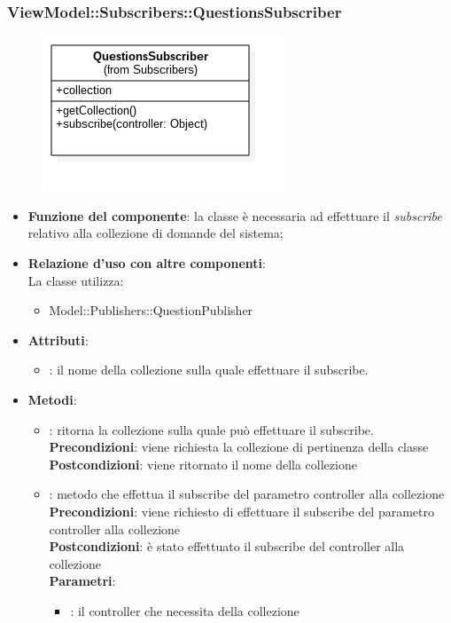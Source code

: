\subsubsection{ViewModel::Subscribers::QuestionsSubscriber}
\begin{figure}[h!]
\begin{center}
	\includegraphics[scale=0.4]{../images/ViewModel/Subscribers/QuestionsSubscriber.png}
\end{center}
\end{figure}
\begin{itemize}
\item\textbf{Funzione del componente}: la classe è necessaria ad effettuare il \emph{subscribe} relativo alla collezione di domande del sistema;
	\item\textbf{Relazione d'uso con altre componenti}: \\
La classe utilizza:
	\begin{itemize}
		\item Model::Publishers::QuestionPublisher	
	\end{itemize}
\item\textbf{Attributi}:
	\begin{itemize}
		\item{}: il nome della collezione sulla quale effettuare il subscribe.\\	
	\end{itemize}
\item\textbf{Metodi}:
	\begin{itemize}
		\item{}: ritorna la collezione sulla quale può effettuare il subscribe.\\
		\textbf{Precondizioni}: viene richiesta la collezione di pertinenza della classe\\
		\textbf{Postcondizioni}: viene ritornato il nome della collezione\\
		\item{}: metodo che effettua il subscribe del parametro controller alla collezione\\
		\textbf{Precondizioni}: viene richiesto di effettuare il subscribe del parametro controller alla collezione\\
		\textbf{Postcondizioni}: è stato effettuato il subscribe del controller alla collezione\\
		\textbf{Parametri}:
			\begin{itemize}
				\item{}: il controller che necessita della collezione\\
			\end{itemize}
	\end{itemize}
\end{itemize}
